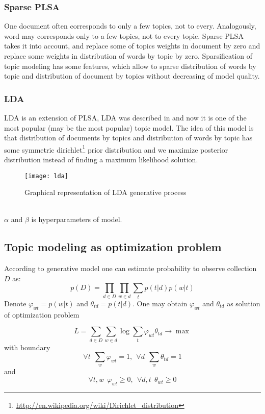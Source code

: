     \subsubsection{Sparse PLSA} \label{sparseModel} 
	One document often corresponds to only a few topics, not to every. Analogously,
	word may corresponds only to a few topics, not to every topic. Sparse PLSA takes it into account,
	and replace some of topics weights in document by zero and replace some weights in distribution
	of words by topic by zero. Sparsification of topic modeling has some features, which allow to sparse distribution of
	words by topic and distribution of document by topics without decreasing of model quality.

    \subsubsection{LDA} \label{LDA}
	LDA is an extension of PLSA, LDA was described in \cite{LDA} and now it is one of the most popular (may be the most popular) topic model. The idea of this model is that
	distribution of documents by topics and distribution of words by topic has some symmetric dirichlet\footnote{\url{http://en.wikipedia.org/wiki/Dirichlet_distribution}} prior distribution and we maximize
	posterior distribution instead of finding a maximum likelihood solution. 
	\begin{figure}[!ht]
	\caption{Graphical representation of LDA generative process}
	\begin{minipage}{\textwidth}
	    \texttt{[image: lda]}
	\end{minipage}
	\end{figure}\\
	$\alpha$ and $\beta$ is hyperparameters of model. 
 
    \subsection{Topic modeling as optimization problem}
	According to generative model one can estimate probability to observe collection $D$ as:
	\begin{equation} p(D) = \prod_{d \in D} \prod_{w \in d} \sum_{t} p(t|d) p(w|t) \end{equation}
	Denote $\varphi_{wt} = p(w|t)$ and $\theta_{td} = p(t|d)$. One may obtain $\varphi_{wt}$
	and $\theta_{td}$ as solution of optimization problem

	\begin{equation} \label{optimization} L = \sum_{d \in D} \sum_{w \in d} \log \sum_{t} \varphi_{wt} \theta_{td}  \to \max \end{equation}
	    with boundary
	\begin{equation} \forall t \ \ \sum_{w} \varphi_{wt} = 1, \ \ \forall d \ \ \sum_{w} \theta_{td} = 1 \end{equation}
	and
	\begin{equation} \forall t, w \ \  \varphi_{wt}  \geq 0, \ \ \forall d, t \ \ \theta_{wt}  \geq 0 \end{equation}

